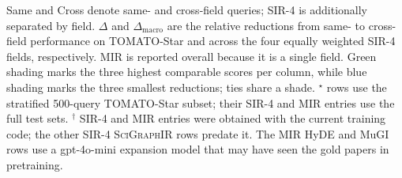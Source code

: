 Same and Cross denote same- and cross-field queries; SIR-4 is additionally
separated by field. $\Delta$ and $\Delta_{\mathrm{macro}}$ are the relative
reductions from same- to cross-field performance on TOMATO-Star and
across the four equally weighted SIR-4 fields, respectively. MIR is
reported overall because it is a single field. Green shading
marks the three highest comparable scores per column, while blue shading
marks the three smallest reductions; ties share a shade. $^\star$ rows use
the stratified 500-query TOMATO-Star subset; their SIR-4 and MIR entries use the
full test sets. $^\dagger$ SIR-4 and MIR entries were obtained with the current
training code; the other SIR-4 \textsc{SciGraphIR} rows predate it. The MIR
HyDE and MuGI rows use a gpt-4o-mini expansion model that may have seen the
gold papers in pretraining.
